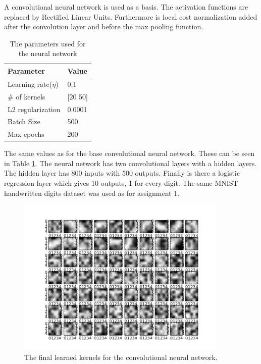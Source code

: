 
A convolutional neural network is used as a basis. The activation functions are replaced by Rectified Linear Units. Furthermore is local cost normalization added after the convolution layer and before the max pooling function. 

\begin{table}[ht!]
\centering
\begin{tabular}{ll}
\textbf{Parameter}           & \textbf{Value} \\ \hline  
Learning rate($\eta$) & 0.1   \\
\# of kernels   		& [20 50]   \\
L2 regularization   & 0.0001 \\
Batch Size          & 500     \\
Max epochs          & 200   \\   
\end{tabular}
\caption{The parameters used for the neural network}
\label{parameters2}
\end{table}

The same values as for the base convolutional neural network. These can be seen in Table \ref{parameters2}. The neural network has two convolutional layers with a hidden layers. The hidden layer has 800 inputs with 500 outputs. Finally is there a logistic regression layer which gives 10 outputs, 1 for every digit. The same MNIST handwritten digits dataset was used as for assignment 1.


\begin{figure}[ht!]
	\centering
	\includegraphics[width=0.9\textwidth]{./img/Exercise2/Afterlearning.png}	
	\caption{The final learned kernels for the convolutional neural network.}
	\label{fig:2:learningKernels}
\end{figure}

